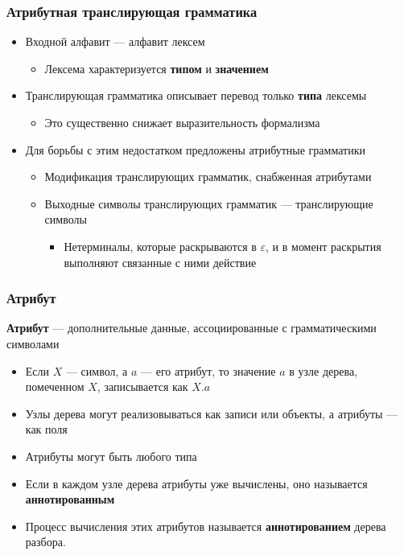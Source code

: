\documentclass{beamer}
\begin{document}
\begin{frame}[fragile]
  \transwipe[direction=90]
  \frametitle{Атрибутная транслирующая грамматика}
  \begin{itemize}
    \item Входной алфавит --- алфавит лексем
    \begin{itemize}
      \item Лексема характеризуется \textbf{типом} и \textbf{значением}
    \end{itemize}
    \item Транслирующая грамматика описывает перевод только \textbf{типа} лексемы
    \begin{itemize}
      \item Это существенно снижает выразительность формализма
    \end{itemize}
    \item Для борьбы с этим недостатком предложены атрибутные грамматики
    \begin{itemize}
      \item Модификация транслирующих грамматик, снабженная атрибутами
      \item Выходные символы транслирующих грамматик --- транслирующие символы
      \begin{itemize}
        \item Нетерминалы, которые раскрываются в $\varepsilon$, и в момент раскрытия выполняют связанные с ними действие
      \end{itemize}
    \end{itemize}
  \end{itemize}
\end{frame}


\begin{frame}[fragile]
  \transwipe[direction=90]
  \frametitle{Атрибут}
  \textbf{Атрибут} --- дополнительные данные, ассоциированные с грамматическими символами
  \begin{itemize}
    \item Если $X$ --- символ, а $a$ --- его атрибут, то значение $a$ в узле дерева, помеченном $X$, записывается как $X.a$
    \item Узлы дерева могут реализовываться как записи или объекты, а атрибуты --- как поля
    \item Атрибуты могут быть любого типа 
    \item Если в каждом узле дерева атрибуты уже вычислены, оно называется \textbf{аннотированным}
    \item Процесс вычисления этих атрибутов называется \textbf{аннотированием} дерева разбора.
  \end{itemize}
\end{frame}
\end{document}
